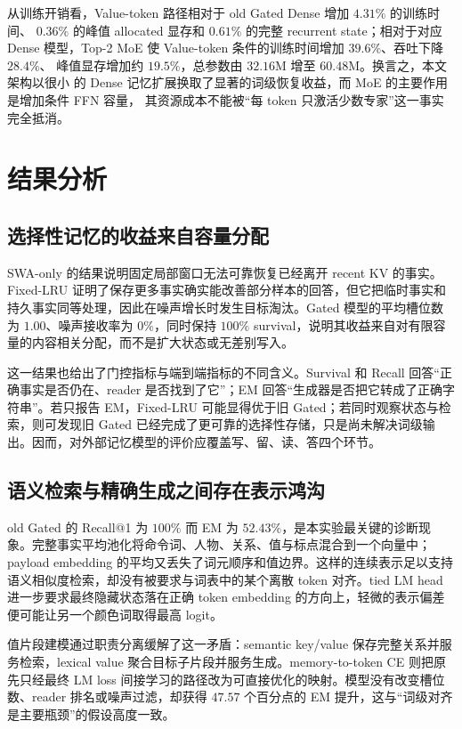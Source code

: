 \documentclass[letterpaper]{article}
\begin{document}
从训练开销看，Value-token 路径相对于 old Gated Dense 增加 $4.31\%$ 的训练时间、
$0.36\%$ 的峰值 allocated 显存和 $0.61\%$ 的完整 recurrent state；相对于对应 Dense
模型，Top-2 MoE 使 Value-token 条件的训练时间增加 $39.6\%$、吞吐下降 $28.4\%$、
峰值显存增加约 $19.5\%$，总参数由 $32.16$M 增至 $60.48$M。换言之，本文架构以很小
的 Dense 记忆扩展换取了显著的词级恢复收益，而 MoE 的主要作用是增加条件 FFN 容量，
其资源成本不能被“每 token 只激活少数专家”这一事实完全抵消。

\FloatBarrier
\section{结果分析}

\subsection{选择性记忆的收益来自容量分配}

SWA-only 的结果说明固定局部窗口无法可靠恢复已经离开 recent KV 的事实。Fixed-LRU 证明了保存更多事实确实能改善部分样本的回答，但它把临时事实和持久事实同等处理，因此在噪声增长时发生目标淘汰。Gated 模型的平均槽位数为 $1.00$、噪声接收率为 $0\%$，同时保持 $100\%$ survival，说明其收益来自对有限容量的内容相关分配，而不是扩大状态或无差别写入。

这一结果也给出了门控指标与端到端指标的不同含义。Survival 和 Recall 回答“正确事实是否仍在、reader 是否找到了它”；EM 回答“生成器是否把它转成了正确字符串”。若只报告 EM，Fixed-LRU 可能显得优于旧 Gated；若同时观察状态与检索，则可发现旧 Gated 已经完成了更可靠的选择性存储，只是尚未解决词级输出。因而，对外部记忆模型的评价应覆盖写、留、读、答四个环节。

\subsection{语义检索与精确生成之间存在表示鸿沟}

old Gated 的 Recall@1 为 $100\%$ 而 EM 为 $52.43\%$，是本实验最关键的诊断现象。完整事实平均池化将命令词、人物、关系、值与标点混合到一个向量中；payload embedding 的平均又丢失了词元顺序和值边界。这样的连续表示足以支持语义相似度检索，却没有被要求与词表中的某个离散 token 对齐。tied LM head 进一步要求最终隐藏状态落在正确 token embedding 的方向上，轻微的表示偏差便可能让另一个颜色词取得最高 logit。

值片段建模通过职责分离缓解了这一矛盾：semantic key/value 保存完整关系并服务检索，lexical value 聚合目标子片段并服务生成。memory-to-token CE 则把原先只经最终 LM loss 间接学习的路径改为可直接优化的映射。模型没有改变槽位数、reader 排名或噪声过滤，却获得 $47.57$ 个百分点的 EM 提升，这与“词级对齐是主要瓶颈”的假设高度一致。
\end{document}
